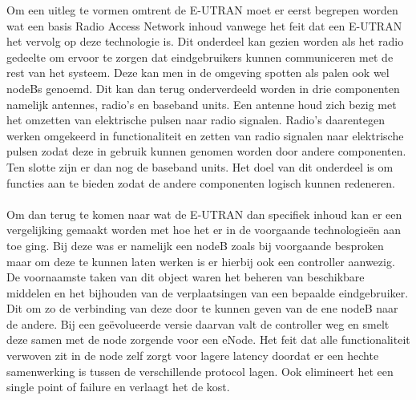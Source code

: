 Om een uitleg te vormen omtrent de E-UTRAN moet er eerst begrepen worden wat een basis Radio Access Network inhoud vanwege het feit dat een E-UTRAN het vervolg op deze technologie is. Dit onderdeel kan gezien worden als het radio gedeelte om ervoor te zorgen dat eindgebruikers kunnen communiceren met de rest van het systeem. Deze kan men in de omgeving spotten als palen ook wel nodeBs genoemd. Dit kan dan terug onderverdeeld worden in drie componenten namelijk antennes, radio's en baseband units. Een antenne houd zich bezig met het  omzetten van elektrische pulsen naar radio signalen. Radio's daarentegen werken omgekeerd in functionaliteit en zetten van radio signalen naar elektrische pulsen zodat deze in gebruik kunnen genomen worden door andere componenten. Ten slotte zijn er dan nog de baseband units. Het doel van dit onderdeel is om functies aan te bieden zodat de andere componenten logisch kunnen redeneren. \autocite{Jones2021} \\ \\
Om dan terug te komen naar wat de E-UTRAN dan specifiek inhoud kan er een vergelijking gemaakt worden met hoe het er in de voorgaande technologieën aan toe ging. Bij deze was er namelijk een nodeB zoals bij voorgaande besproken maar om deze te kunnen laten werken is er hierbij ook een controller aanwezig. De voornaamste taken van dit object waren het beheren van beschikbare middelen en het bijhouden van de verplaatsingen van een bepaalde eindgebruiker. Dit om zo de verbinding van deze door te kunnen geven van de ene nodeB naar de andere. Bij een  geëvolueerde versie daarvan valt de controller weg en smelt deze samen met de node zorgende voor een eNode. \autocite{Ghayas2019} Het feit dat alle functionaliteit verwoven zit in de node zelf zorgt voor lagere latency doordat er een hechte samenwerking is tussen de verschillende protocol lagen. Ook elimineert het een single point of failure en verlaagt het de kost. \autocite{Palat2011} \\

